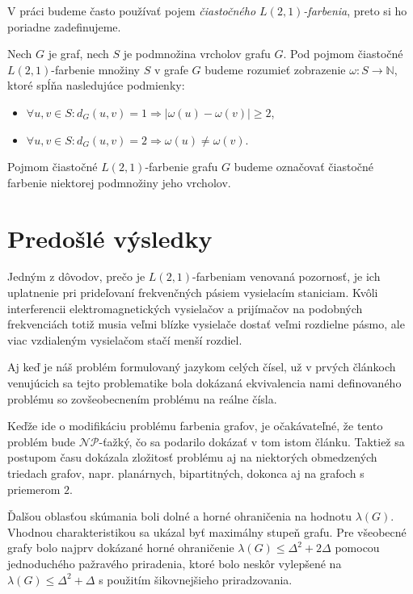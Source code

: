 V práci budeme často používať pojem \emph{čiastočného $L(2,1)$-farbenia}, preto
si ho poriadne zadefinujeme.

\begin{defn}
    Nech $G$ je graf, nech $S$ je podmnožina vrcholov grafu $G$. Pod pojmom
    čiastočné $L(2,1)$-farbenie množiny $S$ v grafe $G$ budeme rozumieť zobrazenie
    $\omega : S \to \mathbb{N}$, ktoré spĺňa nasledujúce podmienky:

    \begin{itemize}
        \item $\forall u, v \in S: d_G(u,v) = 1 \Rightarrow \left| \omega(u) - \omega(v) \right| \ge 2$,
        \item $\forall u, v \in S: d_G(u,v) = 2 \Rightarrow \omega(u) \neq \omega(v)$.
    \end{itemize}

    Pojmom čiastočné $L(2,1)$-farbenie grafu $G$ budeme označovať čiastočné farbenie
    niektorej podmnožiny jeho vrcholov.
\end{defn}

\section{Predošlé výsledky}

Jedným z dôvodov, prečo je $L(2,1)$-farbeniam venovaná pozornosť, je ich uplatnenie
pri prideľovaní frekvenčných pásiem vysielacím staniciam. Kvôli interferencii
elektromagnetických vysielačov a prijímačov na podobných frekvenciách totiž
musia veľmi blízke vysielače dostať veľmi rozdielne pásmo, ale viac vzdialeným
vysielačom stačí menší rozdiel.

Aj keď je náš problém formulovaný jazykom celých čísel, už v prvých článkoch
venujúcich sa tejto problematike bola dokázaná ekvivalencia
nami definovaného problému so zovšeobecnením problému na reálne čísla\cite{griggs_yeh_tree}.

Keďže ide o modifikáciu problému farbenia grafov, je očakávateľné, že tento
problém bude $\mathcal{NP}$-ťažký, čo sa podarilo dokázať v tom istom článku.
Taktiež sa postupom času dokázala zložitosť problému aj na niektorých obmedzených
triedach grafov, napr. planárnych, bipartitných, dokonca aj na grafoch s
priemerom $2$\cite{color_survey}.

Ďalšou oblasťou skúmania boli dolné a horné ohraničenia na hodnotu $\lambda(G)$.
Vhodnou charakteristikou sa ukázal byť maximálny stupeň grafu. Pre všeobecné
grafy bolo najprv dokázané horné ohraničenie $\lambda(G) \leq \Delta^2 + 2\Delta$
pomocou jednoduchého pažravého priradenia\cite{griggs_yeh_tree},
ktoré bolo neskôr vylepšené na $\lambda(G) \leq \Delta^2 + \Delta$ s použitím
šikovnejšieho priradzovania\cite{chang_kuo}.

